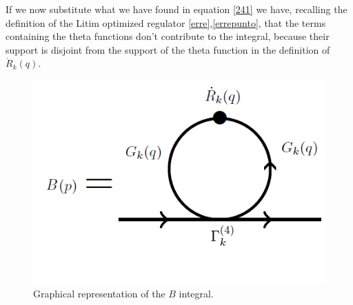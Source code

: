 If we now substitute what we have found in equation \eqref{241} we have, recalling the definition of the Litim optimized regulator \eqref{erre},\eqref{errepunto},
that the terms containing the theta functions don't contribute to the integral, because their support is disjoint from the support of 
the theta function in the definition of $\dot{R}_k(q)$.
\begin{figure}
\begin{center}
\includegraphics[scale=0.55]{Immagini/grafoB.png}
\caption{Graphical representation of the $B$ integral.}
\label{fig:grafoB}
\end{center}
\end{figure}

